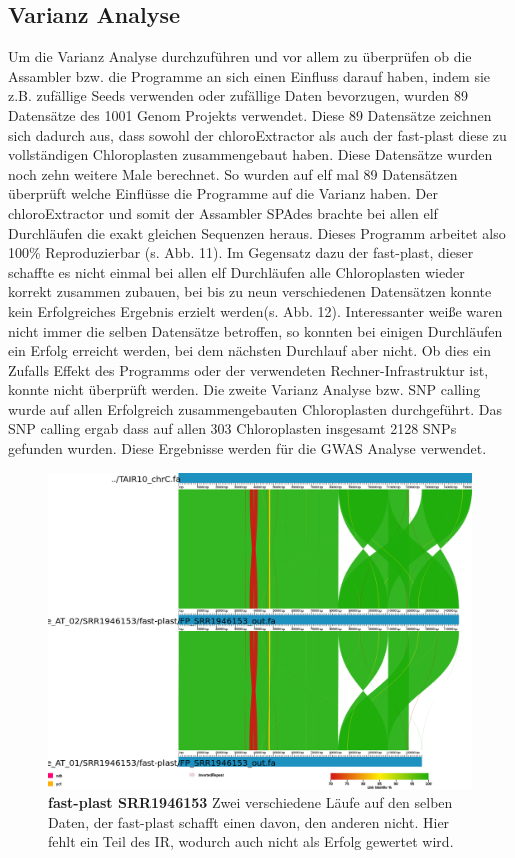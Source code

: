 \documentclass{scrartcl}
\begin{document}
\subsection{Varianz Analyse}
\label{sec-4-7}
Um die Varianz Analyse durchzuführen und vor allem zu überprüfen ob die Assambler bzw. die Programme an sich einen Einfluss darauf haben, indem sie z.B. zufällige Seeds verwenden oder zufällige Daten bevorzugen, wurden 89 Datensätze
des 1001 Genom Projekts verwendet. Diese 89 Datensätze zeichnen sich dadurch aus, dass sowohl der chloroExtractor als auch der fast-plast diese zu vollständigen Chloroplasten zusammengebaut haben. Diese Datensätze
wurden noch zehn weitere Male berechnet. So wurden auf elf mal 89 Datensätzen überprüft welche Einflüsse die Programme auf die Varianz haben. Der chloroExtractor und somit der Assambler SPAdes brachte bei allen elf
Durchläufen die exakt gleichen Sequenzen heraus. Dieses Programm arbeitet also 100\% Reproduzierbar (s. Abb. 11). Im Gegensatz dazu der fast-plast, dieser schaffte es nicht einmal bei allen elf Durchläufen alle Chloroplasten wieder
korrekt zusammen zubauen, bei bis zu neun verschiedenen Datensätzen konnte kein Erfolgreiches Ergebnis erzielt werden(s. Abb. 12). Interessanter weiße waren nicht immer die selben Datensätze betroffen, 
so konnten bei einigen Durchläufen
ein Erfolg erreicht werden, bei dem nächsten Durchlauf aber nicht. Ob dies ein Zufalls Effekt des Programms oder der verwendeten Rechner-Infrastruktur ist, konnte nicht überprüft werden.
Die zweite Varianz Analyse bzw. SNP calling wurde auf allen Erfolgreich zusammengebauten Chloroplasten durchgeführt. Das SNP calling ergab dass auf allen 303 Chloroplasten insgesamt 2128 SNPs gefunden wurden. 
Diese Ergebnisse werden für die GWAS Analyse verwendet.
\begin{figure}
\includegraphics[width=.9\linewidth]{./SRR1946153_FP.png}
\caption[fast-plast SRR1946153]{\textbf{fast-plast SRR1946153} Zwei verschiedene Läufe auf den selben Daten, der fast-plast schafft einen davon, den anderen nicht. Hier fehlt ein Teil des IR, wodurch auch nicht als Erfolg gewertet wird. }
\end{figure}
\end{document}
